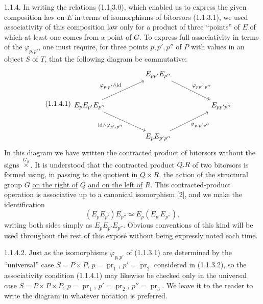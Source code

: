 1.1.4. In writing the relations (1.1.3.0), which enabled us to express
the given composition law on $E$ in terms of isomorphisms of bitorsors
(1.1.3.1), we used associativity of this composition law only for a
product of three ``points'' of $E$ of which at least one comes from a
point of $G$. To express full associativity in terms of the
$\varphi_{p,p'}$, one must require, for three points $p,p',p''$ of $P$
with values in an object $S$ of $\underline T$, that the following
diagram be commutative:
\begin{equation}\tag{1.1.4.1}
\begin{tikzcd}[column sep=huge, row sep=large]
 & E_{pp'}E_{p''} \arrow[dr, "{\varphi_{pp',p''}}"] & \\
 E_pE_{p'}E_{p''}
   \arrow[ur, "{\varphi_{p,p'}\wedge\id}"]
   \arrow[dr, "{\id\wedge\varphi_{p',p''}}"']
 && E_{pp'p''} \\
 & E_pE_{p'p''} \arrow[ur, "{\varphi_{p,p'p''}}"'] &
\end{tikzcd}
\end{equation}
In this diagram we have written the contracted product of bitorsors
without the signs $\mathbin{\overset{G_S}{\times}}$. It is understood
that the contracted product $Q.R$ of two bitorsors is formed using, in
passing to the quotient in $Q\times R$, the action of the structural
group $G$ \underline{on the right of} $Q$ \underline{and on the left of}
$R$. This contracted-product operation is associative up to a canonical
isomorphism [2], and we make the identification
\[
 (E_pE_{p'})E_{p''}\simeq E_p(E_{p'}E_{p''}),
\]
writing both sides simply as $E_pE_{p'}E_{p''}$. Obvious conventions of
this kind will be used throughout the rest of this expos\'e without being
expressly noted each time.

1.1.4.2. Just as the isomorphisms $\varphi_{p,p'}$ of (1.1.3.1) are
determined by the ``universal'' case $S=P\times P$,
$p=\operatorname{pr}_1$, $p'=\operatorname{pr}_2$ considered in
(1.1.3.2), so the associativity condition (1.1.4.1) may likewise be
checked only in the universal case
$S=P\times P\times P$, $p=\operatorname{pr}_1$,
$p'=\operatorname{pr}_2$, $p''=\operatorname{pr}_3$. We leave it to the
reader to write the diagram in whatever notation is preferred.

